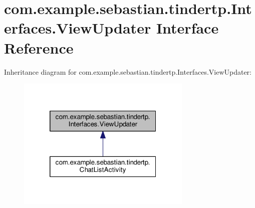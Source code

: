 \hypertarget{interfacecom_1_1example_1_1sebastian_1_1tindertp_1_1Interfaces_1_1ViewUpdater}{}\section{com.\+example.\+sebastian.\+tindertp.\+Interfaces.\+View\+Updater Interface Reference}
\label{interfacecom_1_1example_1_1sebastian_1_1tindertp_1_1Interfaces_1_1ViewUpdater}


Inheritance diagram for com.\+example.\+sebastian.\+tindertp.\+Interfaces.\+View\+Updater\+:
\nopagebreak
\begin{figure}[H]
\begin{center}
\leavevmode
\includegraphics[width=236pt]{interfacecom_1_1example_1_1sebastian_1_1tindertp_1_1Interfaces_1_1ViewUpdater__inherit__graph}
\end{center}
\end{figure}
